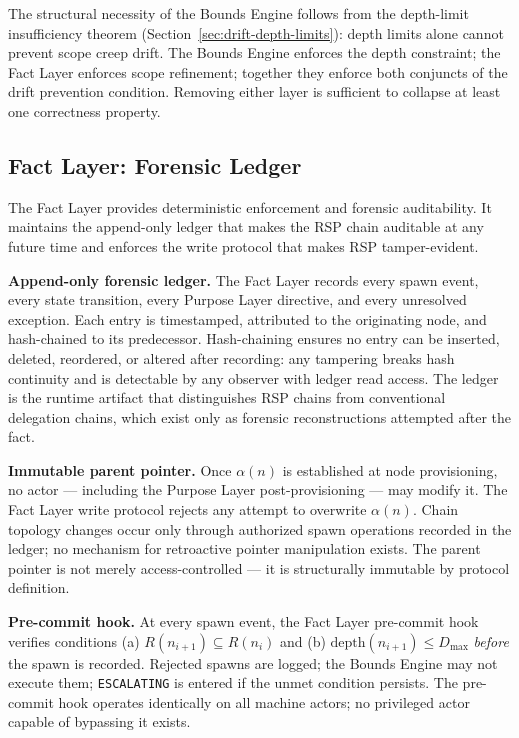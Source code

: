 \medskip
The structural necessity of the Bounds Engine follows from the depth-limit insufficiency theorem (Section~\ref{sec:drift-depth-limits}): depth limits alone cannot prevent scope creep drift. The Bounds Engine enforces the depth constraint; the Fact Layer enforces scope refinement; together they enforce both conjuncts of the drift prevention condition. Removing either layer is sufficient to collapse at least one correctness property.

\subsection{Fact Layer: Forensic Ledger}
\label{sec:rs-fact-ledger}

The Fact Layer provides deterministic enforcement and forensic auditability. It maintains the append-only ledger that makes the RSP chain auditable at any future time and enforces the write protocol that makes RSP tamper-evident.

\medskip
\noindent\textbf{Append-only forensic ledger.} The Fact Layer records every spawn event, every state transition, every Purpose Layer directive, and every unresolved exception. Each entry is timestamped, attributed to the originating node, and hash-chained to its predecessor. Hash-chaining ensures no entry can be inserted, deleted, reordered, or altered after recording: any tampering breaks hash continuity and is detectable by any observer with ledger read access. The ledger is the runtime artifact that distinguishes RSP chains from conventional delegation chains, which exist only as forensic reconstructions attempted after the fact.

\medskip
\noindent\textbf{Immutable parent pointer.} Once $\alpha(n)$ is established at node provisioning, no actor — including the Purpose Layer post-provisioning — may modify it. The Fact Layer write protocol rejects any attempt to overwrite $\alpha(n)$. Chain topology changes occur only through authorized spawn operations recorded in the ledger; no mechanism for retroactive pointer manipulation exists. The parent pointer is not merely access-controlled — it is structurally immutable by protocol definition.

\medskip
\noindent\textbf{Pre-commit hook.} At every spawn event, the Fact Layer pre-commit hook verifies conditions (a) $R(n_{i+1}) \subseteq R(n_i)$ and (b) $\mathrm{depth}(n_{i+1}) \leq D_{\mathrm{max}}$ \emph{before} the spawn is recorded. Rejected spawns are logged; the Bounds Engine may not execute them; \texttt{ESCALATING} is entered if the unmet condition persists. The pre-commit hook operates identically on all machine actors; no privileged actor capable of bypassing it exists.

